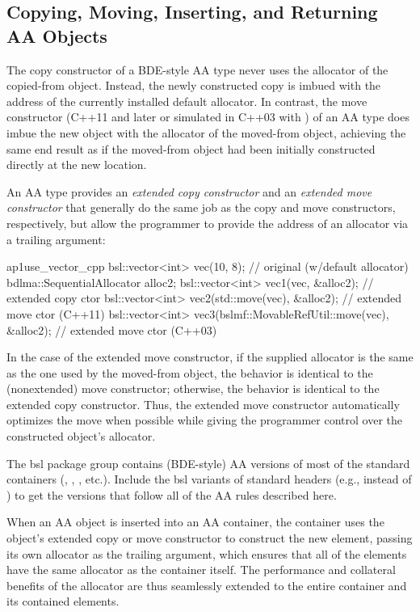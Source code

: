 \subsection{Copying, Moving, Inserting, and Returning AA Objects}

The copy constructor of a BDE-style AA type never uses the allocator of the
copied-from object. Instead, the newly constructed copy is imbued with the
address of the currently installed default allocator. In contrast, the move
constructor (C++11 and later or simulated in C++03 with )
of an AA type does imbue the new object with the allocator of the moved-from 
object, achieving the same end result as if the moved-from object had been
initially constructed directly at the new location.

An AA type provides an \emph{extended copy constructor} and an \emph{extended move
constructor} that generally do the same job as the copy and move constructors,
respectively, but allow the programmer to provide the address of an allocator
via a trailing argument:
\begin{cppcodeblock}{ap1use_vector_cpp}
    bsl::vector<int> vec(10, 8); // original (w/default allocator)
    bdlma::SequentialAllocator alloc2;
    bsl::vector<int> vec1(vec, &alloc2);          // extended copy ctor
    bsl::vector<int> vec2(std::move(vec),
                          &alloc2);               // extended move ctor (C++11)
    bsl::vector<int> vec3(bslmf::MovableRefUtil::move(vec),
    &alloc2);               // extended move ctor (C++03)
\end{cppcodeblock}
In the case of the extended move constructor, if the supplied allocator is the
same as the one used by the moved-from object, the behavior is identical to the
(nonextended) move constructor; otherwise, the behavior is identical to the
extended copy constructor. Thus, the extended move constructor automatically
optimizes the move when possible while giving the programmer control over the
constructed object’s allocator.

The bsl package group contains (BDE-style) AA versions of most of the
standard containers (, , , etc.).
Include the bsl variants of standard headers (e.g., 
instead of ) to get the versions that follow all of the AA rules
described here.

When an AA object is inserted into an AA container, the container uses the
object’s extended copy or move constructor to construct the new element,
passing its own allocator as the trailing argument, which ensures that all of the
elements have the same allocator as the container itself. The performance and
collateral benefits of the allocator are thus seamlessly extended to the entire
container and its contained elements.

